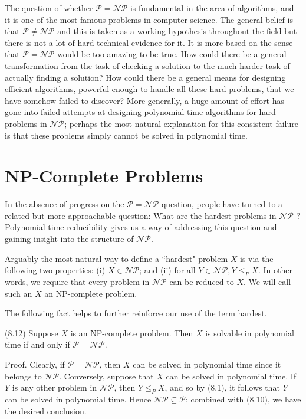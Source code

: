 \documentclass[a4paper, 12pt]{book}
\theoremstyle{dotless}
\begin{document}
The question of whether $\mathcal{P}=\mathcal{N P}$ is fundamental in the area of algorithms, and it is one of the most famous problems in computer science. The general belief is that $\mathcal{P} \neq \mathcal{N} \mathcal{P}$-and this is taken as a working hypothesis throughout the field-but there is not a lot of hard technical evidence for it. It is more based on the sense that $\mathcal{P}=\mathcal{N} \mathcal{P}$ would be too amazing to be true. How could there be a general transformation from the task of checking a solution to the much harder task of actually finding a solution? How could there be a general means for designing efficient algorithms, powerful enough to handle all these hard problems, that we have somehow failed to discover? More generally, a huge amount of effort has gone into failed attempts at designing polynomial-time algorithms for hard problems in $\mathcal{N} \mathcal{P}$; perhaps the most natural explanation for this consistent failure is that these problems simply cannot be solved in polynomial time.

\section{NP-Complete Problems}
In the absence of progress on the $\mathcal{P}=\mathcal{N P}$ question, people have turned to a related but more approachable question: What are the hardest problems in $\mathcal{N P}$ ? Polynomial-time reducibility gives us a way of addressing this question and gaining insight into the structure of $\mathcal{N} \mathcal{P}$.

Arguably the most natural way to define a ``hardest" problem $X$ is via the following two properties: (i) $X \in \mathcal{N \mathcal { P }}$; and (ii) for all $Y \in \mathcal{N \mathcal { P }}, Y \leq_{P} X$. In other words, we require that every problem in $\mathcal{N} \mathcal{P}$ can be reduced to $X$. We will call such an $X$ an NP-complete problem.

The following fact helps to further reinforce our use of the term hardest.

(8.12) Suppose $X$ is an NP-complete problem. Then $X$ is solvable in polynomial time if and only if $\mathcal{P}=\mathcal{N} \mathcal{P}$.

Proof. Clearly, if $\mathcal{P}=\mathcal{N} \mathcal{P}$, then $X$ can be solved in polynomial time since it belongs to $\mathcal{N} \mathcal{P}$. Conversely, suppose that $X$ can be solved in polynomial time. If $Y$ is any other problem in $\mathcal{N P}$, then $Y \leq_{P} X$, and so by (8.1), it follows that $Y$ can be solved in polynomial time. Hence $\mathcal{N} \mathcal{P} \subseteq \mathcal{P}$; combined with (8.10), we have the desired conclusion.
\end{document}
